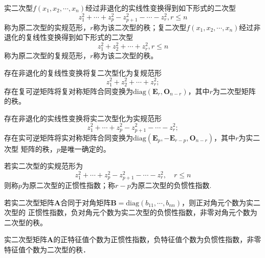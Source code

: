 \begin{definition}[实（复）二次型的规范形]
        实二次型$f(x_1,x_2,\cdots,x_n)$经过非退化的实线性变换得到如下形式的二次型
        $$z_1^2+\cdots+z_p^2-z_{p+1}^2-\cdots-z_r^2,r\leq n$$
        称为原二次型的{\heiti 实规范形}，$r$称为该{\heiti 二次型的秩}；复二次型$f(x_1,x_2,\cdots,x_n)$经过非退化的复线性变换得到如下形式的二次型
        $$z_1^2+z_2^2+\cdots+z_r^2,r\leq n$$
        称为原二次型的{\heiti 复规范形}，$r$称为该二次型的秩。
\end{definition}

\begin{theorem}
    存在非退化的复线性变换将复二次型化为复规范形
    $$z_1^2+z_2^2+\cdots+z_r^2;$$
    存在复可逆矩阵将复对称矩阵合同变换为$\mathrm{diag}(\boldsymbol{E}_r,\boldsymbol{O}_{n-r})$，其中$r$为二次型矩阵的秩。
\end{theorem}

\begin{theorem}[惯性定理]
    存在非退化的实线性变换将实二次型化为实规范形
    $$z_1^2+\cdots+z_p^2-z_{p+1}^2-\cdots-z_r^2;$$
    存在实可逆矩阵将实对称矩阵合同变换为$\mathrm{diag}(\boldsymbol{E}_p,-\boldsymbol{E}_{r-p},\boldsymbol{O}_{n-r})$，其中$r$为实二次型
    矩阵的秩，$p$是唯一确定的。
\end{theorem}

\begin{definition}
    若实二次型的实规范形为
    $$z_1^2+\cdots+z_p^2-z_{p+1}^2-\cdots-z_r^2,\quad r\leq n$$
    则称$p$为原二次型的{\heiti 正惯性指数}；称$r-p$为原二次型的{\heiti 负惯性指数}.
\end{definition}

\begin{theorem}
    若实二次型矩阵$\boldsymbol{A}$合同于对角矩阵$\boldsymbol{B}=\mathrm{diag}(b_{11},\cdots,b_{nn})$，则正对角元个数为实二次型的
    正惯性指数，负对角元个数为实二次型的负惯性指数，非零对角元个数为二次型的秩。
\end{theorem}

\begin{theorem}
    实二次型矩阵$\boldsymbol{A}$的正特征值个数为正惯性指数，负特征值个数为负惯性指数，非零特征值个数为二次型的秩．
\end{theorem}

